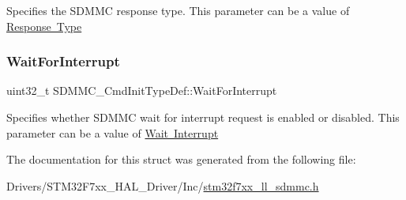 Specifies the S\+D\+M\+MC response type. This parameter can be a value of \mbox{\hyperlink{group___s_d_m_m_c___l_l___response___type}{Response Type}} \mbox{\label{struct_s_d_m_m_c___cmd_init_type_def_abffa8b5e053b202adf3fae688b78f2af}} 
\subsubsection{\texorpdfstring{WaitForInterrupt}{WaitForInterrupt}}
{\footnotesize\ttfamily uint32\+\_\+t S\+D\+M\+M\+C\+\_\+\+Cmd\+Init\+Type\+Def\+::\+Wait\+For\+Interrupt}

Specifies whether S\+D\+M\+MC wait for interrupt request is enabled or disabled. This parameter can be a value of \mbox{\hyperlink{group___s_d_m_m_c___l_l___wait___interrupt___state}{Wait Interrupt}} 

The documentation for this struct was generated from the following file\+:\begin{DoxyCompactItemize}
\item 
Drivers/\+S\+T\+M32\+F7xx\+\_\+\+H\+A\+L\+\_\+\+Driver/\+Inc/\mbox{\hyperlink{stm32f7xx__ll__sdmmc_8h}{stm32f7xx\+\_\+ll\+\_\+sdmmc.\+h}}\end{DoxyCompactItemize}
